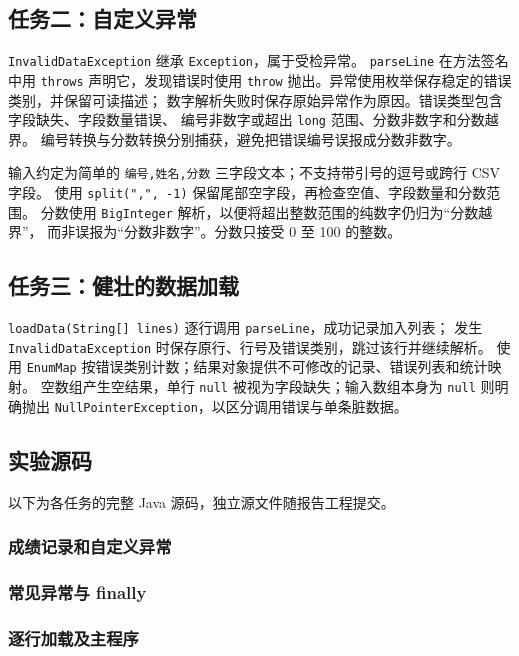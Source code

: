 \subsection{任务二：自定义异常}
\texttt{InvalidDataException} 继承 \texttt{Exception}，属于受检异常。
\texttt{parseLine} 在方法签名中用 \texttt{throws} 声明它，发现错误时使用
\texttt{throw} 抛出。异常使用枚举保存稳定的错误类别，并保留可读描述；
数字解析失败时保存原始异常作为原因。错误类型包含字段缺失、字段数量错误、
编号非数字或超出 \texttt{long} 范围、分数非数字和分数越界。
编号转换与分数转换分别捕获，避免把错误编号误报成分数非数字。

输入约定为简单的 \texttt{编号,姓名,分数} 三字段文本；不支持带引号的逗号或跨行 CSV 字段。
使用 \texttt{split(",", -1)} 保留尾部空字段，再检查空值、字段数量和分数范围。
分数使用 \texttt{BigInteger} 解析，以便将超出整数范围的纯数字仍归为“分数越界”，
而非误报为“分数非数字”。分数只接受 0 至 100 的整数。

\subsection{任务三：健壮的数据加载}
\texttt{loadData(String[] lines)} 逐行调用 \texttt{parseLine}，成功记录加入列表；
发生 \texttt{InvalidDataException} 时保存原行、行号及错误类别，跳过该行并继续解析。
使用 \texttt{EnumMap} 按错误类别计数；结果对象提供不可修改的记录、错误列表和统计映射。
空数组产生空结果，单行 \texttt{null} 被视为字段缺失；输入数组本身为 \texttt{null}
则明确抛出 \texttt{NullPointerException}，以区分调用错误与单条脏数据。

\subsection{实验源码}
以下为各任务的完整 Java 源码，独立源文件随报告工程提交。
\subsubsection{成绩记录和自定义异常}


\subsubsection{常见异常与 finally}

\subsubsection{逐行加载及主程序}


